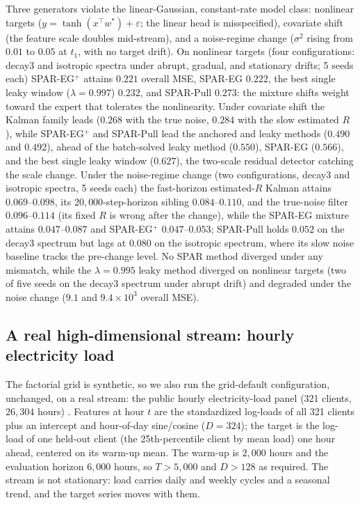 Three generators violate the linear-Gaussian, constant-rate model class: nonlinear targets ($y = \tanh(x^\top w^*) + \varepsilon$; the linear head is misspecified), covariate shift (the feature scale doubles mid-stream), and a noise-regime change ($\sigma^2$ rising from $0.01$ to $0.05$ at $t_1$, with no target drift).
On nonlinear targets (four configurations: decay3 and isotropic spectra under abrupt, gradual, and stationary drifts; 5 seeds each) SPAR-EG$^+$ attains $0.221$ overall MSE, SPAR-EG $0.222$, the best single leaky window ($\lambda = 0.997$) $0.232$, and SPAR-Pull $0.273$: the mixture shifts weight toward the expert that tolerates the nonlinearity.
Under covariate shift the Kalman family leads ($0.268$ with the true noise, $0.284$ with the slow estimated $R$), while SPAR-EG$^+$ and SPAR-Pull lead the anchored and leaky methods ($0.490$ and $0.492$), ahead of the batch-solved leaky method ($0.550$), SPAR-EG ($0.566$), and the best single leaky window ($0.627$), the two-scale residual detector catching the scale change.
Under the noise-regime change (two configurations, decay3 and isotropic spectra, 5 seeds each) the fast-horizon estimated-$R$ Kalman attains $0.069$--$0.098$, its $20{,}000$-step-horizon sibling $0.084$--$0.110$, and the true-noise filter $0.096$--$0.114$ (its fixed $R$ is wrong after the change), while the SPAR-EG mixture attains $0.047$--$0.087$ and SPAR-EG$^+$ $0.047$--$0.053$; SPAR-Pull holds $0.052$ on the decay3 spectrum but lags at $0.080$ on the isotropic spectrum, where its slow noise baseline tracks the pre-change level.
No SPAR method diverged under any mismatch, while the $\lambda = 0.995$ leaky method diverged on nonlinear targets (two of five seeds on the decay3 spectrum under abrupt drift) and degraded under the noise change ($9.1$ and $9.4\times 10^3$ overall MSE).

\subsection{A real high-dimensional stream: hourly electricity load}
\label{app:realstream}

The factorial grid is synthetic, so we also run the grid-default configuration, unchanged, on a real stream: the public hourly electricity-load panel (321 clients, $26{,}304$ hours) \citep{trindade2015electricity,lai2018lstd}.
Features at hour $t$ are the standardized log-loads of all 321 clients plus an intercept and hour-of-day sine/cosine ($D = 324$); the target is the log-load of one held-out client (the 25th-percentile client by mean load) one hour ahead, centered on its warm-up mean.
The warm-up is $2{,}000$ hours and the evaluation horizon $6{,}000$ hours, so $T > 5{,}000$ and $D > 128$ as required.
The stream is not stationary: load carries daily and weekly cycles and a seasonal trend, and the target series moves with them.


